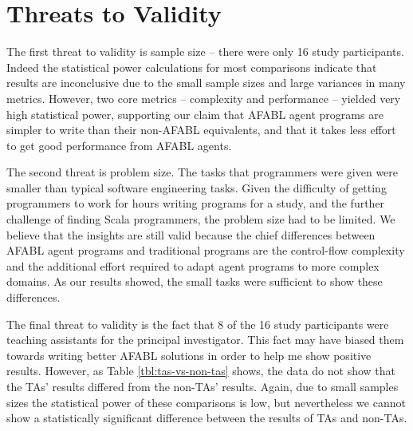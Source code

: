 \section{Threats to Validity}

The first threat to validity is sample size -- there were only 16 study participants. Indeed the statistical power calculations for most comparisons indicate that results are inconclusive due to the small sample sizes and large variances in many metrics. However, two core metrics -- complexity and performance -- yielded very high statistical power, supporting our claim that AFABL agent programs are simpler to write than their non-AFABL equivalents, and that it takes less effort to get good performance from AFABL agents.

The second threat is problem size. The tasks that programmers were given were smaller than typical software engineering tasks. Given the difficulty of getting programmers to work for hours writing programs for a study, and the further challenge of finding Scala programmers, the problem size had to be limited. We believe that the insights are still valid because the chief differences between AFABL agent programs and traditional programs are the control-flow complexity and the additional effort required to adapt agent programs to more complex domains. As our results showed, the small tasks were sufficient to show these differences.

The final threat to validity is the fact that 8 of the 16 study participants were teaching assistants for the principal investigator. This fact may have biased them towards writing better AFABL solutions in order to help me show positive results. However, as Table \ref{tbl:tas-vs-non-tas} shows, the data do not show that the TAs' results differed from the non-TAs' results. Again, due to small samples sizes the statistical power of these comparisons is low, but nevertheless we cannot show a statistically significant difference between the results of TAs and non-TAs.

